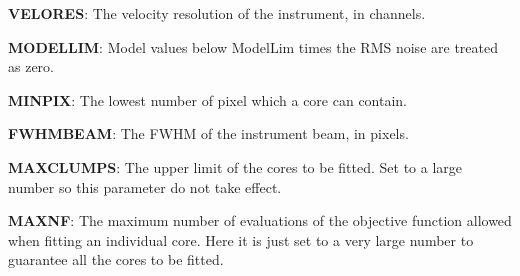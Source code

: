 \documentclass[12pt,preprint]{aastex}
\begin{document}
\begin{table}[htb]
{\rm\bf VELORES}: The velocity resolution of the instrument, in channels.

{\rm\bf MODELLIM}: Model values below ModelLim times the RMS noise are treated as zero.

{\rm\bf MINPIX}: The lowest number of pixel which a core can contain.

{\rm\bf FWHMBEAM}: The FWHM of the instrument beam, in pixels.

{\rm\bf MAXCLUMPS}: The upper limit of the cores to be fitted. Set to a large number so this parameter do not take effect.

{\rm\bf MAXNF}: The maximum number of evaluations of the objective function allowed when fitting an individual core. Here it is just set to a very
large number to guarantee all the cores to be fitted.
\end{table}
\end{document}
